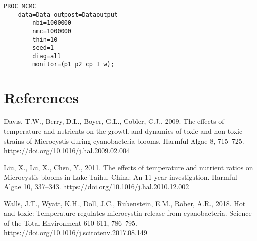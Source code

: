 \documentclass[]{elsarticle} %
\begin{document}
\begin{verbatim}
PROC MCMC 
    data=Data outpost=Dataoutput 
        nbi=1000000 
        nmc=1000000
        thin=10
        seed=1
        diag=all
        monitor=(p1 p2 cp I w); 
\end{verbatim}

\section*{References}\label{references}

\hypertarget{refs}{}
\hypertarget{ref-Davis2009}{}
Davis, T.W., Berry, D.L., Boyer, G.L., Gobler, C.J., 2009. The effects
of temperature and nutrients on the growth and dynamics of toxic and
non-toxic strains of Microcystis during cyanobacteria blooms. Harmful
Algae 8, 715--725. \url{https://doi.org/10.1016/j.hal.2009.02.004}

\hypertarget{ref-Liu2011a}{}
Liu, X., Lu, X., Chen, Y., 2011. The effects of temperature and nutrient
ratios on Microcystis blooms in Lake Taihu, China: An 11-year
investigation. Harmful Algae 10, 337--343.
\url{https://doi.org/10.1016/j.hal.2010.12.002}

\hypertarget{ref-Walls2018}{}
Walls, J.T., Wyatt, K.H., Doll, J.C., Rubenstein, E.M., Rober, A.R.,
2018. Hot and toxic: Temperature regulates microcystin release from
cyanobacteria. Science of the Total Environment 610-611, 786--795.
\url{https://doi.org/10.1016/j.scitotenv.2017.08.149}
\end{document}
